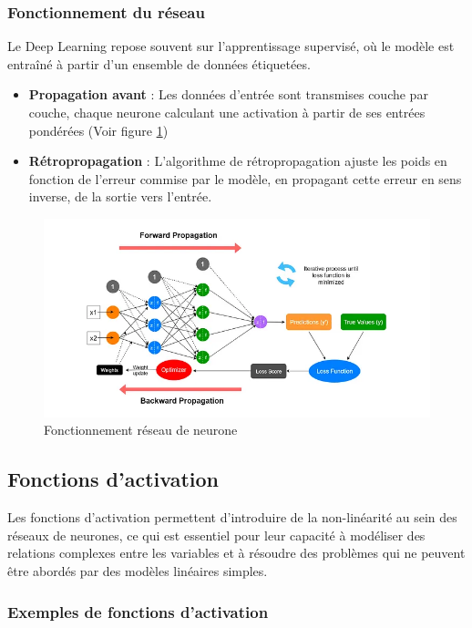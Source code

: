 \subsubsection{Fonctionnement du réseau}
	Le Deep Learning repose souvent sur l'apprentissage supervisé, où le modèle est entraîné à partir d'un ensemble de données étiquetées.
	\begin{itemize}
		\item \textbf{Propagation avant} : Les données d'entrée sont transmises couche par couche, chaque neurone calculant une activation à partir de ses entrées pondérées (Voir figure \ref{fig:backward-propagation})
		\item \textbf{Rétropropagation} : L'algorithme de rétropropagation ajuste les poids en fonction de l'erreur commise par le modèle, en propagant cette erreur en sens inverse, de la sortie vers l'entrée.
	\end{itemize}
	\begin{figure}[h!]
		\centering
		\includegraphics[width=1\linewidth]{images/Backward-Propagation}
		\caption{Fonctionnement réseau de neurone~\cite{fowardpropagation}}
		\label{fig:backward-propagation}
	\end{figure}
	
\subsection{Fonctions d'activation}

Les fonctions d'activation permettent d'introduire de la non-linéarité au sein des réseaux de neurones, ce qui est essentiel pour leur capacité à modéliser des relations complexes entre les variables et à résoudre des problèmes qui ne peuvent être abordés par des modèles linéaires simples.
\subsubsection*{Exemples de fonctions d'activation}

